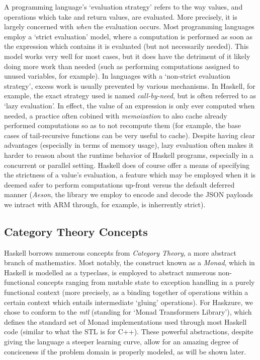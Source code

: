 \documentclass[11pt]{report}
\begin{document}
A programming language's `evaluation strategy' refers to the way values,
and operations which take and return values, are evaluated. More precisely, it is
largely concerned with \textit{when} the evaluation occurs. Most programming
languages employ a `strict evaluation' model, where a computation is performed
as soon as the expression which contains it is evaluated (but not necessarily
needed). This model works very well for most cases, but it does have the
detriment of it likely doing more work than needed (such as performing
computations assigned to unused variables, for example). \newline
In languages with a `non-strict evaluation strategy', excess work is usually
prevented by various mechanisms. In Haskell, for example, the exact strategy
used is named \textit{call-by-need}, but is often referred to as `lazy
evaluation'. In effect, the value of an expression is only ever computed when
needed, a practice often cobined with \textit{memoization} to also cache
already performed computations so as to not recompute them (for example, the
base cases of tail-recursive functions can be very useful to cache).
Despite having clear advantages (especially in terms of memory usage), lazy
evaluation often makes it harder to reason about the runtime behavior of
Haskell programs, especially in a concurrent or parallel setting. Haskell does
of course offer a means of specifying the strictness of a value's evaluation,
a feature which may be employed when it is deemed safer to perform computations
up-front versus the default deferred manner (\textit{Aeson}, the library
we employ to encode and decode the JSON payloads we intract with ARM through,
for example, is inherrently strict).

\subsection{Category Theory Concepts}

Haskell borrows numerous concepts from \textit{Category Theory}, a more
abstract branch of mathematics. Most notably, the construct known
as a \textit{Monad}, which in Haskell is modelled as a typeclass, is employed
to abstract numerous non-functional concepts ranging from
mutable state to exception handling in a purely functional context
(more precisely, as a binding together of operations within a certain
context which entails intermediate `gluing' operations). For Haskzure, we chose
to conform to the \textit{mtl} (standing for `Monad Transformers Library'),
which defines the standard set of Monad implementations used through most
Haskell code (similar to what the STL is for C++).
These powerful abstractions, despite giving the language a steeper
learning curve, allow for an amazing degree of conciceness if the problem
domain is properly modeled, as will be shown later.
\end{document}
